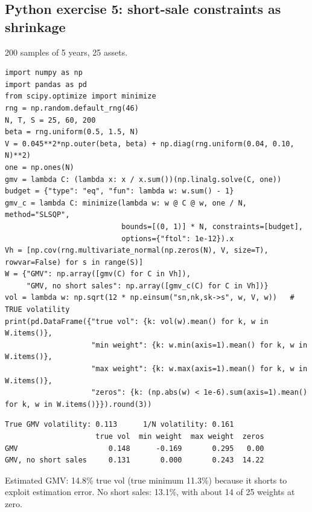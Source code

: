 \documentclass[11pt,a4paper]{report}
\begin{document}
\subsection*{Python exercise 5: short-sale constraints as shrinkage}
200 samples of 5 years, 25 assets.
\begin{lstlisting}
import numpy as np
import pandas as pd
from scipy.optimize import minimize
rng = np.random.default_rng(46)
N, T, S = 25, 60, 200
beta = rng.uniform(0.5, 1.5, N)
V = 0.045**2*np.outer(beta, beta) + np.diag(rng.uniform(0.04, 0.10, N)**2)
one = np.ones(N)
gmv = lambda C: (lambda x: x / x.sum())(np.linalg.solve(C, one))
budget = {"type": "eq", "fun": lambda w: w.sum() - 1}
gmv_c = lambda C: minimize(lambda w: w @ C @ w, one / N, method="SLSQP",
                           bounds=[(0, 1)] * N, constraints=[budget],
                           options={"ftol": 1e-12}).x
Vh = [np.cov(rng.multivariate_normal(np.zeros(N), V, size=T), rowvar=False) for s in range(S)]
W = {"GMV": np.array([gmv(C) for C in Vh]),
     "GMV, no short sales": np.array([gmv_c(C) for C in Vh])}
vol = lambda w: np.sqrt(12 * np.einsum("sn,nk,sk->s", w, V, w))   # TRUE volatility
print(pd.DataFrame({"true vol": {k: vol(w).mean() for k, w in W.items()},
                    "min weight": {k: w.min(axis=1).mean() for k, w in W.items()},
                    "max weight": {k: w.max(axis=1).mean() for k, w in W.items()},
                    "zeros": {k: (np.abs(w) < 1e-6).sum(axis=1).mean() for k, w in W.items()}}).round(3))
\end{lstlisting}
\begin{lstlisting}[style=out]
True GMV volatility: 0.113      1/N volatility: 0.161
                     true vol  min weight  max weight  zeros
GMV                     0.148      -0.169       0.295   0.00
GMV, no short sales     0.131       0.000       0.243  14.22
\end{lstlisting}
Estimated GMV: 14.8\% true vol (true minimum 11.3\%) because it shorts to exploit
estimation error. No short sales: 13.1\%, with about 14 of 25 weights at zero.
\end{document}
